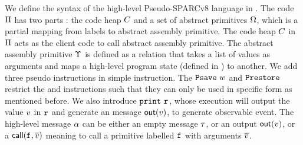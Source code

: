 We define the syntax of the high-level Pseudo-SPARCv8 language 
in \Fig{\ref{fig:syntax-of-concur-pseudo-sparc}}. 
The code $\Pi$ has two parts : 
the code heap $C$ 
and a set of abstract primitives $\Omega$, 
which is a partial mapping from labels to 
abstract assembly primitive. The code heap $C$ in $\Pi$ 
acts as the client code to 
call abstract assembly primitive. 
The abstract assembly primitive $\Upsilon$ 
is defined as a relation that takes a list of values 
as arguments and maps a high-level program state 
(defined in \Fig{\ref{fig:machine-state-concur-pseudo-sparc}}) 
to another. 
We add three pseudo instructions in simple instruction. 
The $\texttt{Psave} \ w$ 
and $\texttt{Prestore}$ restrict the \csave{} and \crestore{}
instructions such that they can only be used in specific form as 
mentioned before.  
We also introduce $\cprint \ \reg{}$, 
whose execution will output the value $v$ in $\texttt{r}_{}$ and 
generate an message $\textsf{out}({v})$, 
to generate observable event. 
The high-level message 
$\alpha$ can be either an empty message $\tau$, or an output 
$\textsf{out}({v})$, or a $\textsf{call}({\texttt{f}_{}, \overline{v}})$ meaning to 
call a primitive labelled $\texttt{f}_{}$ with arguments $\overline{v}$. 

